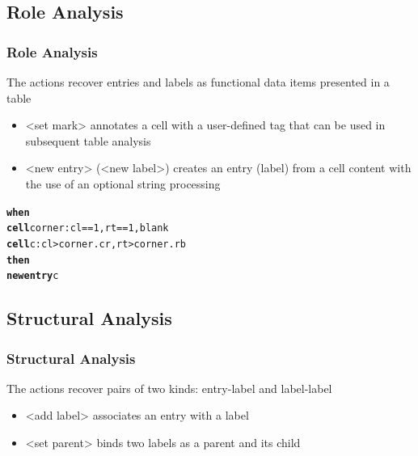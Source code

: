 \documentclass{beamer}
\begin{document}
\subsection{Role Analysis}

\begin{frame}[fragile]
\frametitle{Role Analysis}
The actions recover entries and labels as functional data items presented in a table
\begin{itemize}
	\item \alert{<set mark>} annotates a cell with a user-defined tag that can be used in subsequent table analysis
	\item \alert{<new entry>} (\alert{<new label>}) creates an entry (label) from a cell content with the use of an optional string processing
\end{itemize}

\footnotesize{
\begin{example}
\begin{alltt}
\textbf{when}
  \textbf{cell} corner: cl == 1, rt == 1, blank
  \textbf{cell} c: cl > corner.cr, rt > corner.rb
\textbf{then}
  \textbf{new entry} c
\end{alltt}
\end{example}
}

\end{frame}

\subsection{Structural Analysis}

\begin{frame}[fragile]
\frametitle{Structural Analysis}
The actions recover pairs of two kinds: entry-label and label-label
\begin{itemize}
	\item \alert{<add label>} associates an entry with a label
	\item \alert{<set parent>} binds two labels as a parent and its child
\end{itemize}

\footnotesize{
}

\end{frame}
\end{document}
